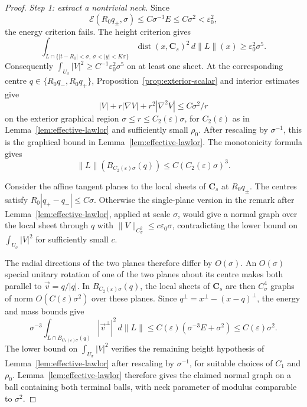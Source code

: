 \documentclass[11pt,a4paper]{article}
\numberwithin{equation}{section}
\theoremstyle{definition}
\theoremstyle{remark}
\newcommand{\dist}{\operatorname{dist}}
\begin{document}
	\begin{proof}
		\emph{Step 1: extract a nontrivial neck.}
		Since
		\[
		\mathcal E(R_0q_\pm,\sigma)
		\le C\sigma^{-3}E\le C\sigma^2<\varepsilon_0^2,
		\]
		the energy criterion fails. The height criterion gives
		\[
		\int_{L\cap\{|t-R_0|<\sigma,\ \sigma<|y|<K\sigma\}}
		\dist(x,\mathbf C_s)^2\,d\|L\|(x)
		\ge\varepsilon_0^2\sigma^5.
		\]
		Consequently $\int_{U_\sigma}|V|^2\ge C^{-1}\varepsilon_0^2\sigma^5$
		on at least one sheet.
		At the corresponding centre $q\in\{R_0q_-,R_0q_+\}$,
		Proposition~\ref{prop:exterior-scalar} and interior estimates give
		\[
		|V|+r|\nabla V|+r^2|\nabla^2V|\le C\sigma^2/r
		\]
		on the exterior graphical region $\sigma\le r\le C_2(\varepsilon)\sigma$,
		for $C_2(\varepsilon)$ as in Lemma~\ref{lem:effective-lawlor}
		and sufficiently small $\rho_0$.
		After rescaling by $\sigma^{-1}$, this is the graphical bound in
		Lemma~\ref{lem:effective-lawlor}.
		The monotonicity formula gives
		\[
		\|L\|(B_{C_2(\varepsilon)\sigma}(q))\le C(C_2(\varepsilon)\sigma)^3.
		\]
		
		Consider the affine tangent planes to the local sheets of $\mathbf C_s$
		at $R_0q_\pm$.
		The centres satisfy $R_0|q_+-q_-|\le C\sigma$. Otherwise the single-plane
		version in the remark after Lemma~\ref{lem:effective-lawlor}, applied
		at scale $\sigma$, would give a normal graph over the local sheet through
		$q$ with $\|V\|_{C^2_\sigma}\le c\varepsilon_0\sigma$, contradicting
		the lower bound on $\int_{U_\sigma}|V|^2$ for sufficiently small $c$.
		
		The radial directions of the two planes therefore differ by $O(\sigma)$.
		An $O(\sigma)$ special unitary rotation of one of the two planes about
		its centre makes both parallel to $\vec v=q/|q|$.
		In $B_{C_2(\varepsilon)\sigma}(q)$, the local sheets of $\mathbf C_s$ are then
		$C^4_\sigma$ graphs of norm $O(C(\varepsilon)\sigma^2)$ over these planes.
		Since $q^\perp=x^\perp-(x-q)^\perp$, the energy and mass bounds give
		\[
		\sigma^{-3}\int_{L\cap B_{C_2(\varepsilon)\sigma}(q)}
		|\vec v^\perp|^2\,d\|L\|
		\le C(\varepsilon)(\sigma^{-3}E+\sigma^2)\le C(\varepsilon)\sigma^2.
		\]
		The lower bound on $\int_{U_\sigma}|V|^2$ verifies the remaining
		height hypothesis of Lemma~\ref{lem:effective-lawlor} after rescaling
		by $\sigma^{-1}$, for suitable choices of $C_1$ and $\rho_0$.
		Lemma~\ref{lem:effective-lawlor} therefore gives
		the claimed normal graph on a ball containing both terminal balls,
		with neck parameter of modulus comparable to $\sigma^2$.
		

\end{proof}
\end{document}
